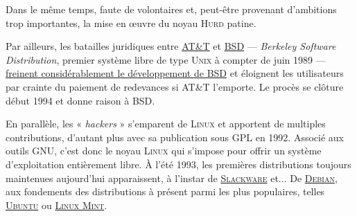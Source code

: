 
%
Dans le même temps, faute de volontaires et, peut-être provenant d'ambitions trop importantes, la mise en œuvre du noyau \textsc{Hurd} patine. 

Par ailleurs, les batailles juridiques entre \href{https://fr.wikipedia.org/wiki/AT\%26T}{\textsc{AT\&T}} et \href{https://fr.wikipedia.org/wiki/Berkeley_Software_Distribution}{BSD} --- \textit{Berkeley Software Distribution}, premier système libre de type \textsc{Unix} à compter de juin 1989 --- \href{https://www.freebsd.org/doc/fr_FR.ISO8859-1/articles/explaining-bsd/article.html\#why-is-bsd-not-better-known}{freinent considérablement le développement de BSD} et éloignent les utilisateurs par crainte du paiement de redevances si \textsc{AT\&T} l'emporte. Le procès se clôture début 1994 et donne raison à BSD.

%
En parallèle, les « \textit{hackers} » s'emparent de \textsc{Linux} et apportent de multiples contributions, d'autant plus avec sa publication sous GPL en 1992. Associé aux outils GNU, c'est donc le noyau \textsc{Linux} qui s'impose pour offrir un système d'exploitation entièrement libre. À l'été 1993, les premières distributions toujours maintenues aujourd'hui apparaissent, à l'instar de \href{http://www.slackware.com/}{\textsc{Slackware}} et... De \href{https://www.debian.org/index.fr.html}{\textsc{Debian}}, aux fondements des distributions à présent parmi les plus populaires, telles \href{https://ubuntu.com/}{\textsc{Ubuntu}} ou \href{https://linuxmint.com/}{\textsc{Linux Mint}}.

